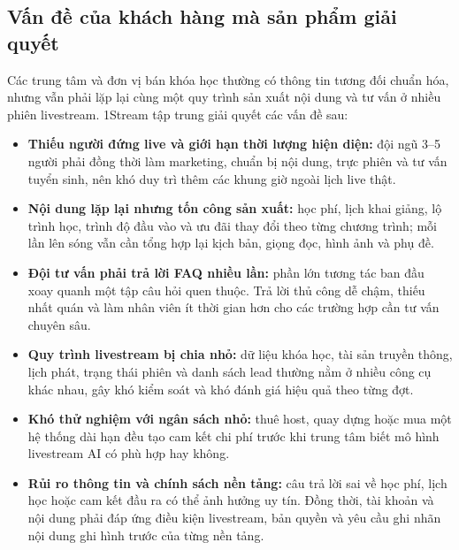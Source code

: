 \subsection{Vấn đề của khách hàng mà sản phẩm giải quyết}

Các trung tâm và đơn vị bán khóa học thường có thông tin tương đối chuẩn hóa,
nhưng vẫn phải lặp lại cùng một quy trình sản xuất nội dung và tư vấn ở nhiều
phiên livestream. 1Stream tập trung giải quyết các vấn đề sau:

\begin{itemize}
    \item \textbf{Thiếu người đứng live và giới hạn thời lượng hiện diện:} đội
    ngũ 3--5 người phải đồng thời làm marketing, chuẩn bị nội dung, trực phiên và
    tư vấn tuyển sinh, nên khó duy trì thêm các khung giờ ngoài lịch live thật.
    \item \textbf{Nội dung lặp lại nhưng tốn công sản xuất:} học phí, lịch khai
    giảng, lộ trình học, trình độ đầu vào và ưu đãi thay đổi theo từng chương
    trình; mỗi lần lên sóng vẫn cần tổng hợp lại kịch bản, giọng đọc, hình ảnh và
    phụ đề.
    \item \textbf{Đội tư vấn phải trả lời FAQ nhiều lần:} phần lớn tương tác ban
    đầu xoay quanh một tập câu hỏi quen thuộc. Trả lời thủ công dễ chậm, thiếu
    nhất quán và làm nhân viên ít thời gian hơn cho các trường hợp cần tư vấn
    chuyên sâu.
    \item \textbf{Quy trình livestream bị chia nhỏ:} dữ liệu khóa học, tài sản
    truyền thông, lịch phát, trạng thái phiên và danh sách lead thường nằm ở
    nhiều công cụ khác nhau, gây khó kiểm soát và khó đánh giá hiệu quả theo
    từng đợt.
    \item \textbf{Khó thử nghiệm với ngân sách nhỏ:} thuê host, quay dựng hoặc
    mua một hệ thống dài hạn đều tạo cam kết chi phí trước khi trung tâm biết mô
    hình livestream AI có phù hợp hay không.
    \item \textbf{Rủi ro thông tin và chính sách nền tảng:} câu trả lời sai về
    học phí, lịch học hoặc cam kết đầu ra có thể ảnh hưởng uy tín. Đồng thời,
    tài khoản và nội dung phải đáp ứng điều kiện livestream, bản quyền và yêu
    cầu ghi nhãn nội dung ghi hình trước của từng nền tảng.
\end{itemize}

